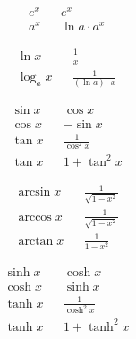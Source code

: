 \begin{boxleft}
\end{boxleft}\begin{boxrightshaded} \begin{align}
  &e^x& 	&e^x\\
  &a^x& 	&\ln a\cdot a^x
 \end{align}
\end{boxrightshaded}

\begin{boxleft}
\end{boxleft}\begin{boxrightshaded}
 \begin{align} 
  &\ln x& &\frac{1}{x}\\
  &\log_a x&	&\frac{1}{(\ln a)\cdot x}
 \end{align}
\end{boxrightshaded}

\begin{boxleft}
\end{boxleft}\begin{boxrightshaded}
 \begin{align} 
  &\sin x& 	&\cos x \\
  &\cos x& 	&-\sin x\\
  &\tan x&	&\frac{1}{\cos^2 x}\\
  &\tan x&	&1+\tan^2 x
\end{align}\end{boxrightshaded}
 
\begin{boxleft}
\end{boxleft}\begin{boxrightshaded}
 \begin{align} 
  &\arcsin x& &\frac{1}{\sqrt{1-x^2}}\\
  &\arccos x& &\frac{-1}{\sqrt{1-x^2}}\\
  &\arctan x& &\frac{1}{1-x^2}
\end{align}\end{boxrightshaded}

\begin{boxleft}
\end{boxleft}\begin{boxrightshaded}
 \begin{align} 
  &\sinh x& &\cosh x\\
  &\cosh x& &\sinh x\\
  &\tanh x& &\frac{1}{\cosh^2 x}\\
  &\tanh x& &1+\tanh^2 x
\end{align}\end{boxrightshaded}
          
